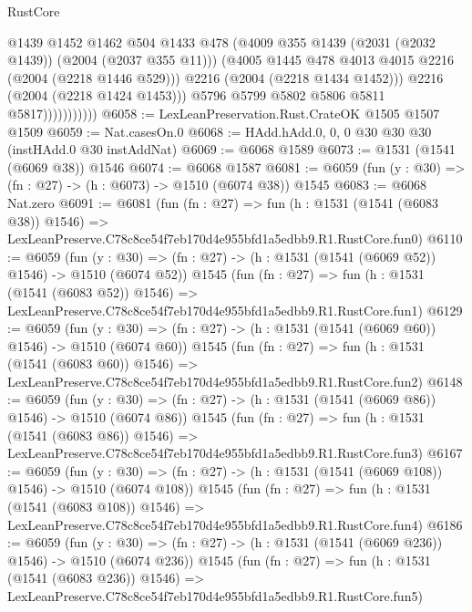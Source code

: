 \begin{lexlean}{RustCore}
\begin{coremodule}
                              @1439
                              @1452
                              @1462
                              @504
                              @1433
                              @478
                              (@4009 @355 @1439 (@2031 (@2032 @1439)) (@2004 (@2037 @355 @11)))
                              (@4005 @1445 @478 @4013 @4015 @2216 (@2004 (@2218 @1446 @529)))
                              @2216
                              (@2004 (@2218 @1434 @1452)))
                            @2216
                            (@2004 (@2218 @1424 @1453)))
                          @5796
                          @5799
                          @5802
                          @5806
                          @5811
                          @5817)))))))))))
@6058 := LexLeanPreservation.Rust.CrateOK @1505 @1507 @1509
@6059 := Nat.casesOn.{0}
@6068 := HAdd.hAdd.{0, 0, 0} @30 @30 @30 (instHAdd.{0} @30 instAddNat)
@6069 := @6068 @1589
@6073 := @1531 (@1541 (@6069 @38)) @1546
@6074 := @6068 @1587
@6081 := @6059 (fun (y : @30) => (fn : @27) -> (h : @6073) -> @1510 (@6074 @38)) @1545
@6083 := @6068 Nat.zero
@6091 := @6081
    (fun (fn : @27) =>
    fun (h : @1531 (@1541 (@6083 @38)) @1546) =>
    LexLeanPreserve.C78c8ce54f7eb170d4e955bfd1a5edbb9.R1.RustCore.fun0)
@6110 := @6059
    (fun (y : @30) => (fn : @27) -> (h : @1531 (@1541 (@6069 @52)) @1546) -> @1510 (@6074 @52))
    @1545
    (fun (fn : @27) =>
    fun (h : @1531 (@1541 (@6083 @52)) @1546) =>
    LexLeanPreserve.C78c8ce54f7eb170d4e955bfd1a5edbb9.R1.RustCore.fun1)
@6129 := @6059
    (fun (y : @30) => (fn : @27) -> (h : @1531 (@1541 (@6069 @60)) @1546) -> @1510 (@6074 @60))
    @1545
    (fun (fn : @27) =>
    fun (h : @1531 (@1541 (@6083 @60)) @1546) =>
    LexLeanPreserve.C78c8ce54f7eb170d4e955bfd1a5edbb9.R1.RustCore.fun2)
@6148 := @6059
    (fun (y : @30) => (fn : @27) -> (h : @1531 (@1541 (@6069 @86)) @1546) -> @1510 (@6074 @86))
    @1545
    (fun (fn : @27) =>
    fun (h : @1531 (@1541 (@6083 @86)) @1546) =>
    LexLeanPreserve.C78c8ce54f7eb170d4e955bfd1a5edbb9.R1.RustCore.fun3)
@6167 := @6059
    (fun (y : @30) => (fn : @27) -> (h : @1531 (@1541 (@6069 @108)) @1546) -> @1510 (@6074 @108))
    @1545
    (fun (fn : @27) =>
    fun (h : @1531 (@1541 (@6083 @108)) @1546) =>
    LexLeanPreserve.C78c8ce54f7eb170d4e955bfd1a5edbb9.R1.RustCore.fun4)
@6186 := @6059
    (fun (y : @30) => (fn : @27) -> (h : @1531 (@1541 (@6069 @236)) @1546) -> @1510 (@6074 @236))
    @1545
    (fun (fn : @27) =>
    fun (h : @1531 (@1541 (@6083 @236)) @1546) =>
    LexLeanPreserve.C78c8ce54f7eb170d4e955bfd1a5edbb9.R1.RustCore.fun5)

\end{coremodule}
\end{lexlean}
